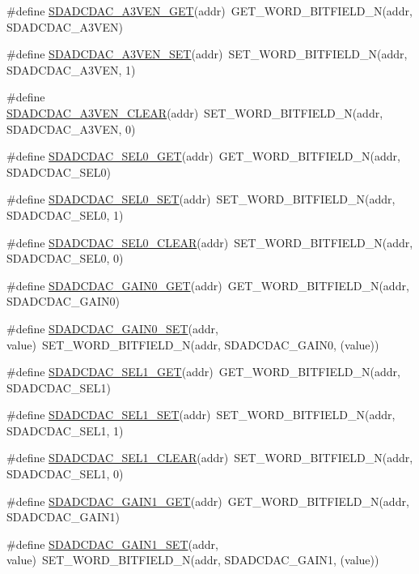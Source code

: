 \begin{DoxyCompactItemize}
\item 
\#define \hyperlink{a00568_a9933884effec1c188c9bb7e74173bee4}{SDADCDAC\_\-A3VEN\_\-GET}(addr)~GET\_\-WORD\_\-BITFIELD\_\-N(addr, SDADCDAC\_\-A3VEN)
\item 
\#define \hyperlink{a00568_ae9f70dbe89461a59ba165f9ca35a785d}{SDADCDAC\_\-A3VEN\_\-SET}(addr)~SET\_\-WORD\_\-BITFIELD\_\-N(addr, SDADCDAC\_\-A3VEN, 1)
\item 
\#define \hyperlink{a00568_af8315c618025934f5e71569770867ba1}{SDADCDAC\_\-A3VEN\_\-CLEAR}(addr)~SET\_\-WORD\_\-BITFIELD\_\-N(addr, SDADCDAC\_\-A3VEN, 0)
\item 
\#define \hyperlink{a00568_a0fcdddce35ffeadb217bd02b23ebbfcb}{SDADCDAC\_\-SEL0\_\-GET}(addr)~GET\_\-WORD\_\-BITFIELD\_\-N(addr, SDADCDAC\_\-SEL0)
\item 
\#define \hyperlink{a00568_a3face213c069b912e2329bab697f462f}{SDADCDAC\_\-SEL0\_\-SET}(addr)~SET\_\-WORD\_\-BITFIELD\_\-N(addr, SDADCDAC\_\-SEL0, 1)
\item 
\#define \hyperlink{a00568_a2ead8ddc82d96d4940530c830a68f306}{SDADCDAC\_\-SEL0\_\-CLEAR}(addr)~SET\_\-WORD\_\-BITFIELD\_\-N(addr, SDADCDAC\_\-SEL0, 0)
\item 
\#define \hyperlink{a00568_aec171bfda0b80f81939dbc0c8cf9e3b6}{SDADCDAC\_\-GAIN0\_\-GET}(addr)~GET\_\-WORD\_\-BITFIELD\_\-N(addr, SDADCDAC\_\-GAIN0)
\item 
\#define \hyperlink{a00568_a124fc4de72e65e0689ad9fed65e71eae}{SDADCDAC\_\-GAIN0\_\-SET}(addr, value)~SET\_\-WORD\_\-BITFIELD\_\-N(addr, SDADCDAC\_\-GAIN0, (value))
\item 
\#define \hyperlink{a00568_aaab76e5157a3244b786307dd5e1b0a71}{SDADCDAC\_\-SEL1\_\-GET}(addr)~GET\_\-WORD\_\-BITFIELD\_\-N(addr, SDADCDAC\_\-SEL1)
\item 
\#define \hyperlink{a00568_a23864f8090ea746db95a3b594d4968d3}{SDADCDAC\_\-SEL1\_\-SET}(addr)~SET\_\-WORD\_\-BITFIELD\_\-N(addr, SDADCDAC\_\-SEL1, 1)
\item 
\#define \hyperlink{a00568_ab69f63c7dec35d7c854f92f1de8adee0}{SDADCDAC\_\-SEL1\_\-CLEAR}(addr)~SET\_\-WORD\_\-BITFIELD\_\-N(addr, SDADCDAC\_\-SEL1, 0)
\item 
\#define \hyperlink{a00568_ad34d3a01dda708c3d635d11630bac133}{SDADCDAC\_\-GAIN1\_\-GET}(addr)~GET\_\-WORD\_\-BITFIELD\_\-N(addr, SDADCDAC\_\-GAIN1)
\item 
\#define \hyperlink{a00568_a969201456b3e0b7deb4d85bcebb6cf81}{SDADCDAC\_\-GAIN1\_\-SET}(addr, value)~SET\_\-WORD\_\-BITFIELD\_\-N(addr, SDADCDAC\_\-GAIN1, (value))
\item 

\end{DoxyCompactItemize}
